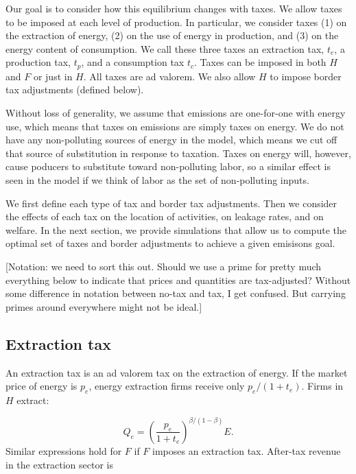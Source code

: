 \documentclass[notitlepage,12pt]{article}
\begin{document}
Our goal is to consider how this equilibrium changes with taxes. We allow
taxes to be imposed at each level of production. In particular, we consider
taxes (1) on the extraction of energy, (2) on the use of energy in
production, and (3) on the energy content of consumption. We call these
three taxes an extraction tax, $t_{e}$, a production tax, $t_{p}$, and a
consumption tax $t_{c}$. Taxes can be imposed in both $H$ and $F$ or just in 
$H$. All taxes are ad valorem. We also allow $H$ to impose border tax
adjustments (defined below).

Without loss of generality, we assume that emissions are one-for-one with
energy use, which means that taxes on emissions are simply taxes on energy.
We do not have any non-polluting sources of energy in the model, which means
we cut off that source of substitution in response to taxation. Taxes on
energy will, however, cause poducers to substitute toward non-polluting
labor, so a similar effect is seen in the model if we think of labor as the
set of non-polluting inputs.

We first define each type of tax and border tax adjustments. Then we
consider the effects of each tax on the location of activities, on leakage
rates, and on welfare. In the next section, we provide simulations that
allow us to compute the optimal set of taxes and border adjustments to
achieve a given emisisons goal.

[Notation: we need to sort this out. Should we use a prime for pretty much
everything below to indicate that prices and quantities are tax-adjusted?
Without some difference in notation between no-tax and tax, I get confused.
But carrying primes around everywhere might not be ideal.]

\subsection{Extraction tax}

An extraction tax is an ad valorem tax on the extraction of energy. If the
market price of energy is $p_{e}$, energy extraction firms receive only $%
p_{e}/\left( 1+t_{e}\right) $. Firms in $H$ extract:

\begin{equation*}
Q_{e}=\left( \frac{p_{e}}{1+t_{e}}\right) ^{\beta /\left( 1-\beta \right) }E.
\end{equation*}%
Similar expressions hold for $F$ if $F$ imposes an extraction tax. After-tax
revenue in the extraction sector is
\end{document}

